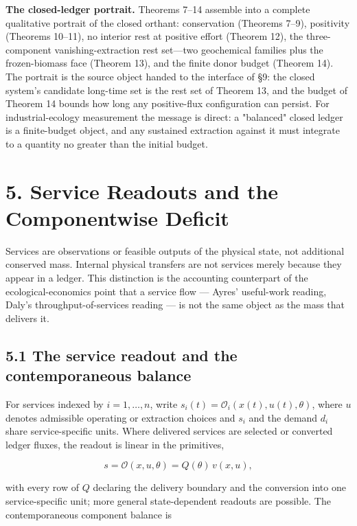 \documentclass[11pt]{article}
\begin{document}
\textbf{The closed-ledger portrait.} Theorems 7--14 assemble into a complete qualitative portrait of the closed orthant: conservation (Theorems 7--9), positivity (Theorems 10--11), no interior rest at positive effort (Theorem 12), the three-component vanishing-extraction rest set---two geochemical families plus the frozen-biomass face (Theorem 13), and the finite donor budget (Theorem 14). The portrait is the source object handed to the interface of \S9: the closed system's candidate long-time set is the rest set of Theorem 13, and the budget of Theorem 14 bounds how long any positive-flux configuration can persist. For industrial-ecology measurement the message is direct: a "balanced" closed ledger is a finite-budget object, and any sustained extraction against it must integrate to a quantity no greater than the initial budget.

\vspace{0.8em}

\section*{5. Service Readouts and the Componentwise Deficit}\label{5-service-readouts-and-the-componentwise-deficit}

Services are observations or feasible outputs of the physical state, not additional conserved mass. Internal physical transfers are not services merely because they appear in a ledger. This distinction is the accounting counterpart of the ecological-economics point that a service flow --- Ayres' useful-work reading, Daly's throughput-of-services reading --- is not the same object as the mass that delivers it.

\subsection*{5.1 The service readout and the contemporaneous balance}\label{51-the-service-readout-and-the-contemporaneous-balance}

For services indexed by \(i = 1, \ldots, n\), write \(s_i(t) =\allowbreak{} \mathcal{O}_i(x(t),\allowbreak{} u(t),\allowbreak{} \theta)\), where \(u\) denotes admissible operating or extraction choices and \(s_i\) and the demand \(d_i\) share service-specific units. Where delivered services are selected or converted ledger fluxes, the readout is linear in the primitives, 

$$s = \mathcal{O}(x, u, \theta) = Q(\theta)\, v(x, u),$$

 with every row of \(Q\) declaring the delivery boundary and the conversion into one service-specific unit; more general state-dependent readouts are possible. The contemporaneous component balance is 
\end{document}
